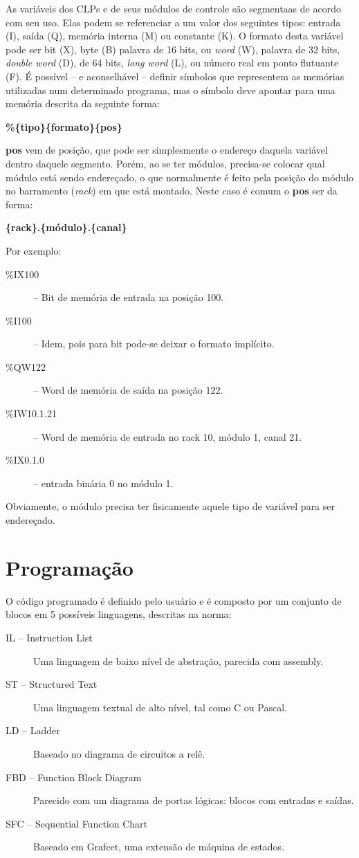 As variáveis dos CLPs e de seus módulos de controle são segmentaas de acordo com seu uso. Elas podem se referenciar a um valor dos seguintes tipos: entrada (I), saída (Q), memória interna (M) ou constante (K). O formato desta variável pode ser bit (X), byte (B) palavra de 16 bits, ou \emph{word} (W), palavra de 32 bits, \emph{double word} (D), de 64 bits, \emph{long word} (L),  ou número real em ponto flutuante (F). É possível -- e aconselhável -- definir símbolos que representem as memórias utilizadas num determinado programa, mas o símbolo deve apontar para uma memória descrita da seguinte forma:
\begin{center}
\textbf{\%\{tipo\}\{formato\}\{pos\}}
\end{center}

\textbf{pos} vem de posição, que pode ser simplesmente o endereço daquela variável dentro daquele segmento. Porém, ao se ter módulos, precisa-se colocar qual módulo está sendo endereçado, o que normalmente é feito pela posição do módulo no barramento (\emph{rack}) em que está montado. Neste caso é comum o \textbf{pos} ser da forma:
\begin{center}
\textbf{\{rack\}.\{módulo\}.\{canal\}}
\end{center}

Por exemplo:

\begin{description}
  \item[\%IX100] -- Bit de memória de entrada na posição 100.
  \item[\%I100] -- Idem, pois para bit pode-se deixar o formato implícito.
  \item[\%QW122] -- Word de memória de saída na posição 122.
  \item[\%IW10.1.21] -- Word de memória de entrada no rack 10, módulo 1, canal 21.
  \item[\%IX0.1.0] -- entrada binária 0 no módulo 1.
\end{description}

Obviamente, o módulo precisa ter fisicamente aquele tipo de variável para ser endereçado.

\section{Programação}
O código programado é definido pelo usuário e é composto por um conjunto de blocos em 5 possíveis linguagens, descritas na norma:
\begin{description}
  \item[IL -- Instruction List] Uma linguagem de baixo nível de abstração, parecida com assembly.
  \item[ST -- Structured Text] Uma linguagem textual de alto nível, tal como C ou Pascal.
  \item[LD -- Ladder] Baseado no diagrama de circuitos a relê.
  \item[FBD -- Function Block Diagram] Parecido com um diagrama de portas lógicas: blocos com entradas e saídas.
  \item[SFC -- Sequential Function Chart] Baseado em Grafcet, uma extensão de máquina de estados.
\end{description}

